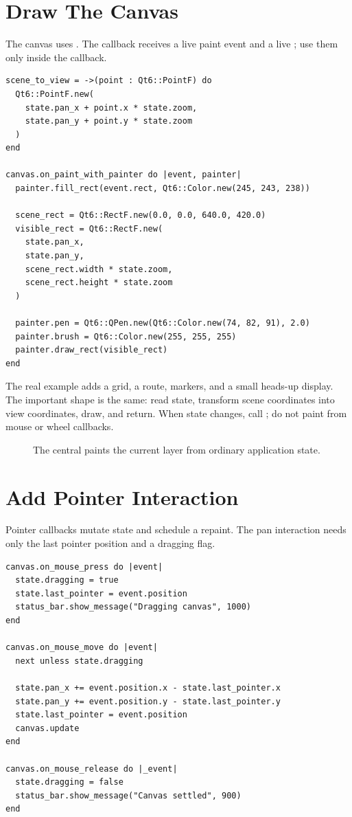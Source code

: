 \section{Draw The Canvas}

The canvas uses . The callback receives a live paint event and a live ; use them only inside the callback.

\begin{lstlisting}[style=crystal]
scene_to_view = ->(point : Qt6::PointF) do
  Qt6::PointF.new(
    state.pan_x + point.x * state.zoom,
    state.pan_y + point.y * state.zoom
  )
end

canvas.on_paint_with_painter do |event, painter|
  painter.fill_rect(event.rect, Qt6::Color.new(245, 243, 238))

  scene_rect = Qt6::RectF.new(0.0, 0.0, 640.0, 420.0)
  visible_rect = Qt6::RectF.new(
    state.pan_x,
    state.pan_y,
    scene_rect.width * state.zoom,
    scene_rect.height * state.zoom
  )

  painter.pen = Qt6::QPen.new(Qt6::Color.new(74, 82, 91), 2.0)
  painter.brush = Qt6::Color.new(255, 255, 255)
  painter.draw_rect(visible_rect)
end
\end{lstlisting}

The real example adds a grid, a route, markers, and a small heads-up display. The important shape is the same: read state, transform scene coordinates into view coordinates, draw, and return. When state changes, call ; do not paint from mouse or wheel callbacks.

\begin{figure}[tbp]
  \centering
  \caption{The central  paints the current layer from ordinary application state.}
\end{figure}

\section{Add Pointer Interaction}

Pointer callbacks mutate state and schedule a repaint. The pan interaction needs only the last pointer position and a dragging flag.

\begin{lstlisting}[style=crystal]
canvas.on_mouse_press do |event|
  state.dragging = true
  state.last_pointer = event.position
  status_bar.show_message("Dragging canvas", 1000)
end

canvas.on_mouse_move do |event|
  next unless state.dragging

  state.pan_x += event.position.x - state.last_pointer.x
  state.pan_y += event.position.y - state.last_pointer.y
  state.last_pointer = event.position
  canvas.update
end

canvas.on_mouse_release do |_event|
  state.dragging = false
  status_bar.show_message("Canvas settled", 900)
end
\end{lstlisting}

